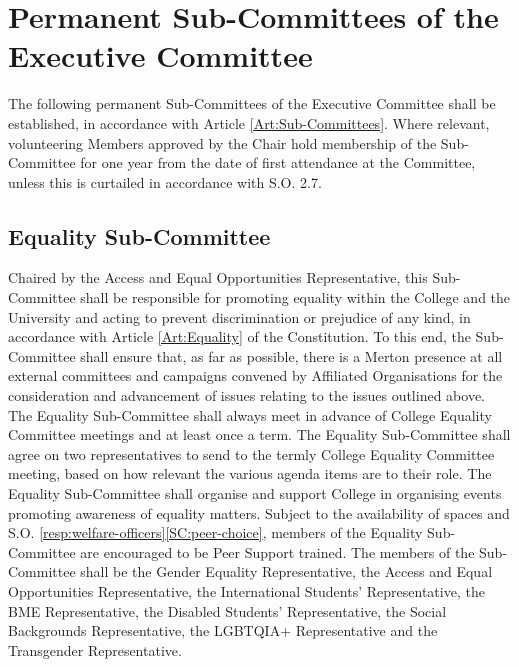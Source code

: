 \section{Permanent Sub-Committees of the Executive Committee}
\npara The following permanent Sub-Committees of the Executive Committee shall be established, in accordance with Article \ref{Art:Sub-Committees}.
\npara Where relevant, volunteering Members approved by the Chair hold membership of the Sub-Committee for one year from the date of first attendance at the Committee, unless this is curtailed in accordance with S.O. 2.7.
\subsection{Equality Sub-Committee} \label{ssec:equality-committee}
\npara Chaired by the Access and Equal Opportunities Representative, this Sub-Committee shall be responsible for promoting equality within the College and the University and acting to prevent discrimination or prejudice of any kind, in accordance with Article \ref{Art:Equality} of the Constitution. To this end, the Sub-Committee shall ensure that, as far as possible, there is a Merton presence at all external committees and campaigns convened by Affiliated Organisations for the consideration and advancement of issues relating to the issues outlined above.
\npara The Equality Sub-Committee shall always meet in advance of College Equality Committee meetings and at least once a term.
\npara The Equality Sub-Committee shall agree on two representatives to send to the termly College Equality Committee meeting, based on how relevant the various agenda items are to their role.
\npara The Equality Sub-Committee shall organise and support College in organising events promoting awareness of equality matters.
\npara Subject to the availability of spaces and S.O. \ref{resp:welfare-officers}\ref{SC:peer-choice}, members of the Equality Sub-Committee are encouraged to be Peer Support trained.
\npara The members of the Sub-Committee shall be the Gender Equality Representative, the Access and Equal Opportunities Representative, the International Students’ Representative, the BME Representative, the Disabled Students’ Representative, the Social Backgrounds Representative, the LGBTQIA+ Representative and the Transgender Representative.
